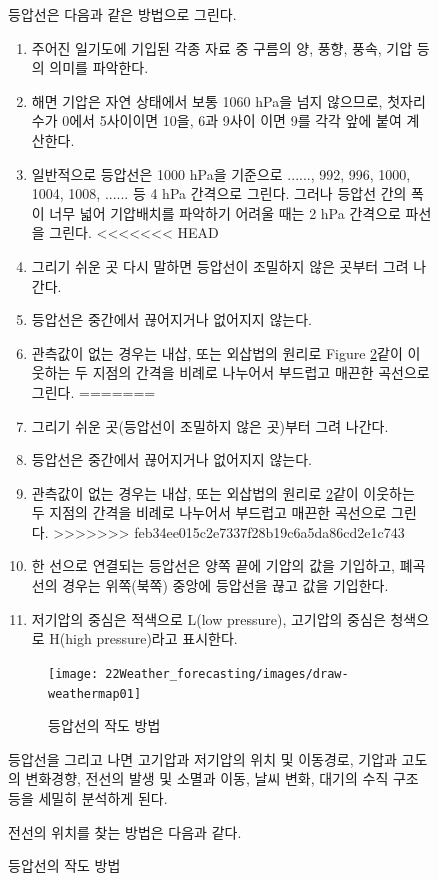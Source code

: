 \begin{figure}[p]
등압선은 다음과 같은 방법으로 그린다.
\begin{enumerate}
 \item 주어진 일기도에 기입된 각종 자료 중 구름의 양, 풍향, 풍속, 기압 등의 의미를 파악한다. 
 \item 해면 기압은 자연 상태에서 보통 1060 hPa을 넘지 않으므로, 첫자리 수가 0에서 5사이이면 10을, 6과 9사이 이면 9를 각각 앞에 붙여 계산한다.
 \item 일반적으로 등압선은 1000 hPa을 기준으로 ......, 992, 996, 1000, 1004, 1008, ...... 등 4 hPa 간격으로 그린다. 그러나 등압선 간의 폭이 너무 넓어 기압배치를 파악하기 어려울 때는 2 hPa 간격으로 파선을 그린다.
<<<<<<< HEAD
 \item 그리기 쉬운 곳 다시 말하면 등압선이 조밀하지 않은 곳부터 그려 나간다.
 \item 등압선은 중간에서 끊어지거나 없어지지 않는다.
 \item 관측값이 없는 경우는 내삽, 또는 외삽법의 원리로 Figure \ref{fig:drawweathermap01}\과 같이 이웃하는 두 지점의 간격을 비례로 나누어서 부드럽고 매끈한 곡선으로 그린다.
=======
 \item 그리기 쉬운 곳(등압선이 조밀하지 않은 곳)부터 그려 나간다.
 \item 등압선은 중간에서 끊어지거나 없어지지 않는다.
 \item 관측값이 없는 경우는 내삽, 또는 외삽법의 원리로 \ref{fig:drawweathermap01}\과 같이 이웃하는 두 지점의 간격을 비례로 나누어서 부드럽고 매끈한 곡선으로 그린다.
>>>>>>> feb34ee015c2e7337f28b19c6a5da86cd2e1c743
 \item 한 선으로 연결되는 등압선은 양쪽 끝에 기압의 값을 기입하고, 폐곡선의 경우는 위쪽(북쪽) 중앙에 등압선을 끊고 값을 기입한다. 
 \item 저기압의 중심은 적색으로 L(low pressure), 고기압의 중심은 청색으로 H(high pressure)라고 표시한다.
\end{enumerate}

\begin{figure}[h]
	\centering
	\texttt{[image: 22Weather\_forecasting/images/draw-weathermap01]}
	\caption{등압선의 작도 방법}
	\label{fig:drawweathermap01}
\end{figure}

등압선을 그리고 나면 고기압과 저기압의 위치 및 이동경로, 기압과 고도의 변화경향, 전선의 발생 및 소멸과 이동, 날씨 변화, 대기의 수직 구조 등을 세밀히 분석하게 된다. 

전선의 위치를 찾는 방법은 다음과 같다.


\end{figure}
